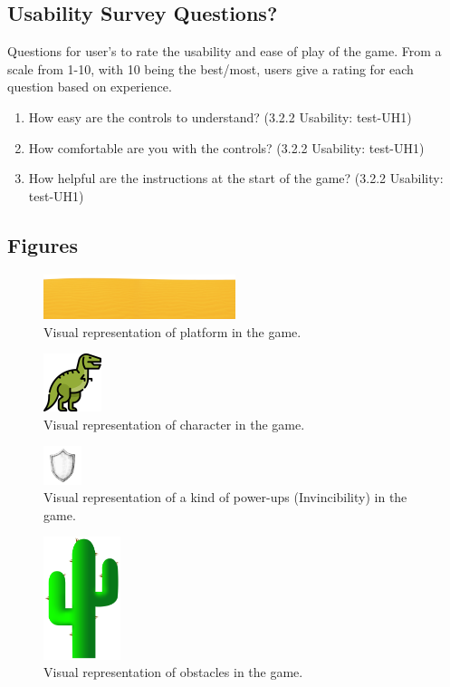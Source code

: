 \documentclass[12pt, titlepage]{article}
\begin{document}
\subsection{Usability Survey Questions?}
Questions for user's to rate the usability and ease of play of the game. From a scale from 1-10, with 10 being the best/most, users give a rating for each question based on experience.
\begin{enumerate}
    \item How easy are the controls to understand? (3.2.2 Usability: test-UH1)
    \item How comfortable are you with the controls?  (3.2.2 Usability: test-UH1)
    \item How helpful are the instructions at the start of the game?  (3.2.2 Usability: test-UH1)
\end{enumerate}

\subsection{Figures}
\begin{figure}[!h]
    \centering
    \includegraphics[width=0.5\textwidth]{ground.png}
    \caption{Visual representation of platform in the game.}
\end{figure}
\begin{figure}[!h]
    \centering
    \includegraphics[width=0.15\textwidth]{Dino.png}
    \caption{Visual representation of character in the game.}
\end{figure}
\begin{figure}[!h]
    \centering
    \includegraphics[width=0.1\textwidth]{Power.png}
    \caption{Visual representation of a kind of power-ups (Invincibility) in the game.}
\end{figure}
\begin{figure}[!h]
    \centering
    \includegraphics[width=0.2\textwidth]{cactus.png}
    \caption{Visual representation of obstacles in the game.}
\end{figure}
\end{document}
